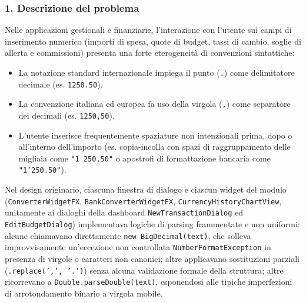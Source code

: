 \documentclass[11pt,a4paper,openright]{report}
\begin{document}
\subsubsection*{1. Descrizione del problema}
Nelle applicazioni gestionali e finanziarie, l'interazione con l'utente sui campi di inserimento numerico (importi di spesa, quote di budget, tassi di cambio, soglie di allerta e commissioni) presenta una forte eterogeneità di convenzioni sintattiche:
\begin{itemize}
  \item La notazione standard internazionale impiega il punto (\texttt{.}) come delimitatore decimale (es. \texttt{1250.50}).
  \item La convenzione italiana ed europea fa uso della virgola (\texttt{,}) come separatore dei decimali (es. \texttt{1250,50}).
  \item L'utente inserisce frequentemente spaziature non intenzionali prima, dopo o all'interno dell'importo (es. copia-incolla con spazi di raggruppamento delle migliaia come \texttt{"1 250,50"} o apostrofi di formattazione bancaria come \texttt{"1'250.50"}).
\end{itemize}
Nel design originario, ciascuna finestra di dialogo e ciascun widget del modulo (\texttt{ConverterWidgetFX}, \texttt{BankConverterWidgetFX}, \texttt{CurrencyHistoryChartView}, unitamente ai dialoghi della dashboard \texttt{NewTransactionDialog} ed \texttt{EditBudgetDialog}) implementava logiche di parsing frammentate e non uniformi: alcune chiamavano direttamente \texttt{new BigDecimal(text)}, che solleva improvvisamente un'eccezione non controllata \texttt{NumberFormatException} in presenza di virgole o caratteri non canonici; altre applicavano sostituzioni parziali (\texttt{.replace(',', '.')}) senza alcuna validazione formale della struttura; altre ricorrevano a \texttt{Double.parseDouble(text)}, esponendosi alle tipiche imperfezioni di arrotondamento binario a virgola mobile.
\end{document}
